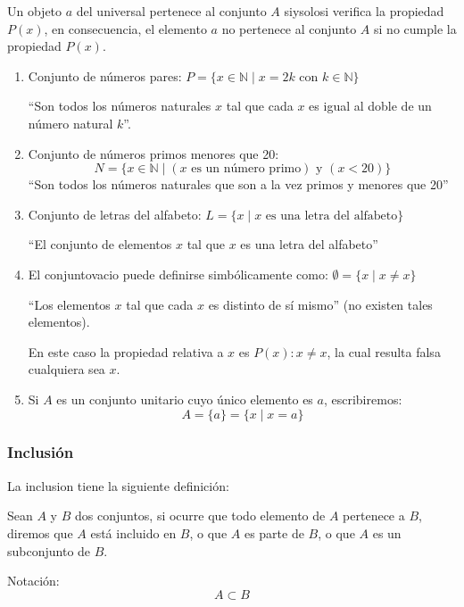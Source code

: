 Un objeto $a$ del universal pertenece al conjunto $A$ \gls{siysolosi} verifica la propiedad $P(x)$, en consecuencia, el elemento $a$ no pertenece al conjunto $A$ si no cumple la propiedad $P(x)$.

\begin{fmd-example}
	\begin{enumerate}
		\item Conjunto de números pares: \(P = \{x \in \mathbb{N} \mid x = 2 k \mbox{ con } k \in \mathbb{N} \}\)
		
		``Son todos los números naturales $x$ tal que cada $x$ es igual al doble de un número natural $k$''.
		
		\item Conjunto de números primos menores que 20: \[N = \{x \in \mathbb{N} \mid (x \mbox{ es un número primo}) \mbox{ y } (x < 20) \}\]
		``Son todos los números naturales que son a la vez primos y menores que 20''
		
		\item Conjunto de letras del alfabeto: \(L = \{x \mid x \mbox{ es una letra del alfabeto}\}\)
		
		``El conjunto de elementos $x$ tal que $x$ es una letra del alfabeto''
		
		\item El \gls{conjuntovacio} puede definirse simbólicamente como: $\emptyset = \{ x \mid x \ne x \}$
		
		``Los elementos $x$ tal que cada $x$ es distinto de sí mismo'' (no existen tales elementos).
		
		En este caso la propiedad relativa a $x$ es $P(x): x \ne x$, la cual resulta falsa cualquiera sea $x$.
		
		\item Si $A$ es un conjunto unitario cuyo único elemento es $a$, escribiremos:
		\[ A = \{ a\} = \{ x \mid x = a \} \]
	\end{enumerate}
\end{fmd-example}

\subsubsection{Inclusión}
La \gls{inclusion} tiene la siguiente definición: 

\begin{fmd-definition}[Inclusión]
	Sean $A$ y $B$ dos conjuntos, si ocurre que todo elemento de $A$ pertenece a $B$, diremos que $A$ está incluido en $B$, o que $A$ es parte de $B$, o que $A$ es un subconjunto de $B$.
	
	Notación:  \[A \subset B\]
\end{fmd-definition}

